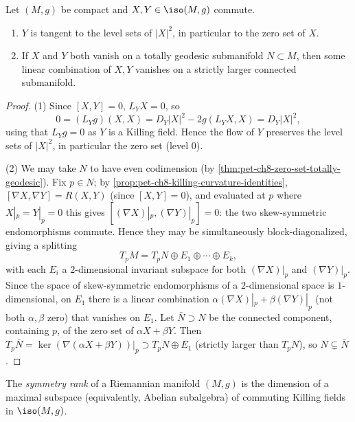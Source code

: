 \begin{proposition}[Proposition 8.3.8]
  \label{prop:pet-ch8-commuting-killing-fields-properties}
  Let $(M,g)$ be compact and $X,Y\in\iso(M,g)$ commute.
  \begin{enumerate}
    \item $Y$ is tangent to the level sets of $|X|^2$, in particular to the
      zero set of $X$.
    \item If $X$ and $Y$ both vanish on a totally geodesic submanifold
      $N\subset M$, then some linear combination of $X,Y$ vanishes on a
      strictly larger connected submanifold.
  \end{enumerate}
\end{proposition}
\begin{proof}
  (1) Since $[X,Y]=0$, $L_YX=0$, so
  \[
    0=(L_Yg)(X,X)=D_Y|X|^2-2g(L_YX,X)=D_Y|X|^2,
  \]
  using that $L_Yg=0$ as $Y$ is a Killing field. Hence the flow of $Y$
  preserves the level sets of $|X|^2$, in particular the zero set (level
  $0$).

  (2) We may take $N$ to have even codimension (by
  \cref{thm:pet-ch8-zero-set-totally-geodesic}). Fix $p\in N$; by
  \cref{prop:pet-ch8-killing-curvature-identities}, $[\nabla X,\nabla Y]=R(X,Y)$
  (since $[X,Y]=0$), and evaluated at $p$ where $X|_p=Y|_p=0$ this gives
  $[(\nabla X)|_p,(\nabla Y)|_p]=0$: the two skew-symmetric endomorphisms
  commute. Hence they may be simultaneously block-diagonalized, giving a
  splitting
  \[
    T_pM=T_pN\oplus E_1\oplus\cdots\oplus E_k,
  \]
  with each $E_i$ a $2$-dimensional invariant subspace for both $(\nabla X)|_p$
  and $(\nabla Y)|_p$. Since the space of skew-symmetric endomorphisms of a
  $2$-dimensional space is $1$-dimensional, on $E_1$ there is a linear
  combination $\alpha(\nabla X)|_p+\beta(\nabla Y)|_p$ (not both $\alpha,\beta$
  zero) that vanishes on $E_1$. Let $\bar N\supset N$ be the connected
  component, containing $p$, of the zero set of $\alpha X+\beta Y$. Then
  $T_p\bar N=\ker(\nabla(\alpha X+\beta Y))|_p\supset T_pN\oplus E_1$
  (strictly larger than $T_pN$), so $N\subsetneq\bar N$.
\end{proof}

\begin{definition}
  \label{def:pet-ch8-symmetry-rank}
  The \emph{symmetry rank} of a Riemannian manifold $(M,g)$ is the dimension of
  a maximal subspace (equivalently, Abelian subalgebra) of commuting Killing
  fields in $\iso(M,g)$.
\end{definition}

